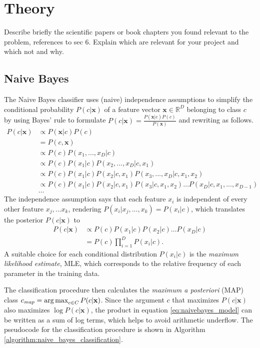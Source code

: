 \section{Theory}
Describe briefly the scientific papers or book chapters you found relevant to the problem, references to sec 6. Explain which are relevant for your project and which not and why.

\subsection{Naive Bayes}
The Naive Bayes classifier uses (naive) independence assumptions to simplify the conditional probability $P(c\vert\mathbf{x})$ of a feature vector $\mathbf{x} \in \mathbb{R}^D$ belonging to class $c$ by using Bayes' rule to formulate $P(c\vert \mathbf{x}) = \frac{P(\mathbf{x}\vert c) P(c)}{P(\mathbf{x})}$ and rewriting as follows.
\begin{align*}
P(c\vert \mathbf{x}) &\propto P(\mathbf{x}\vert c)P(c)
\\&=P(c,\mathbf{x})
\\&\propto P(c) P(x_1,...,x_D\vert c)
\\&\propto P(c) P(x_1\vert c) P(x_2,...,x_D\vert c, x_1)
\\&\propto P(c) P(x_1\vert c) P(x_2\vert c, x_1) P(x_3,...,x_D\vert c,x_1,x_2)
\\&\propto P(c) P(x_1\vert c) P(x_2\vert c, x_1) P(x_3\vert c,x_1,x_2) \dots P(x_D\vert c, x_1,...,x_{D-1})
\\&\dots
\end{align*}
The independence assumption says that each feature $x_i$ is independent of every other feature $x_j,...x_k$, rendering $P(x_i\vert x_j,...,x_k) = P(x_i\vert c)$, which translates the posterior $P(c\vert \mathbf{x})$ to
\begin{align}
P(c\vert \mathbf{x}) &\propto P(c) P(x_1\vert c) P(x_2\vert c) \dots P(x_D\vert c) \nonumber
\\&= P(c) \prod_{i=1}^{D} P(x_i\vert c).\label{eq:naivebayes_model}
\end{align}
A suitable choice for each conditional distribution $P(x_i\vert c)$ is the \textit{maximum likelihood estimate}, MLE, which corresponds to the relative frequency of each parameter in the training data.

The classification procedure then calculates the \textit{maximum a posteriori} (MAP) class $c_{\textit{map}} = \operatorname*{arg\,max}_{c\in C} P(c\vert \mathbf{x})$. Since the argument $c$ that maximizes $P(c\vert \mathbf{x})$ also maximizes $\log P(c\vert \mathbf{x})$, the product in equation \ref{eq:naivebayes_model} can be written as a sum of log terms, which helps to avoid arithmetic underflow. The pseudocode for the classification procedure is shown in Algorithm \ref{algorithm:naive_bayes_classification}.

